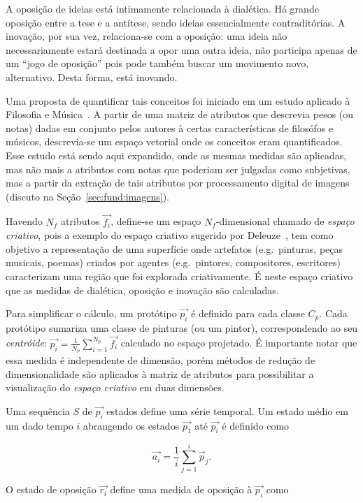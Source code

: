 A oposição de ideias está intimamente relacionada à dialética. Há grande
oposição entre a tese e a antítese, sendo ideias essencialmente
contraditórias. A inovação, por sua vez, relaciona-se com a oposição: uma ideia
não necessariamente estará destinada a opor uma outra ideia, não participa
apenas de um ``jogo de oposição'' pois pode também buscar um movimento novo,
alternativo. Desta forma, está inovando.

Uma proposta de quantificar tais conceitos foi iniciado em um estudo aplicado à
Filosofia e Música~\cite{vieira}. A partir de uma matriz de atributos que
descrevia pesos (ou notas) dadas em conjunto pelos autores à certas
características de filosófos e músicos, descrevia-se um espaço vetorial onde os
conceitos eram quantificados. Esse estudo está sendo aqui expandido, onde as
mesmas medidas são aplicadas, mas não mais a atributos com notas que poderiam
ser julgadas como subjetivas, mas a partir da extração de tais atributos por
processamento digital de imagens (discuto na Seção~\ref{sec:fund:imagens}).

Havendo $N_f$ atributos $\vec{f_i}$, define-se um espaço $N_f$-dimensional chamado de
\textit{espaço criativo}, pois a exemplo do espaço criativo sugerido por
Deleuze~\cite{deleuze}, tem como objetivo a representação de uma superfície onde artefatos
(e.g.\ pinturas, peças musicais, poemas) criados por agentes (e.g.\ pintores,
compositores, escritores) caracterizam uma região que foi explorada
criativamente. É neste espaço criativo que as medidas de dialética, oposição e
inovação são calculadas.

Para simplificar o cálculo, um protótipo $\vec{p_i}$ é definido para cada classe
$C_p$. Cada protótipo sumariza uma classe de pinturas (ou um pintor),
correspondendo ao seu \textit{centróide}: $\vec{p_i} = \frac{1}{N_p}
\sum_{i=1}^{N_p} \vec{f_i}$ calculado no espaço projetado. É importante notar
que essa medida é independente de dimensão, porém métodos de redução de
dimensionalidade são aplicados à matriz de atributos para possibilitar a
visualização do \textit{espaço criativo} em duas dimensões.

Uma sequência $S$ de $\vec{p_i}$ estados define uma série temporal. Um estado
médio em um dado tempo $i$ abrangendo os estados $\vec{p_1}$ até $\vec{p_i}$ é
definido como

\begin{equation}
\vec{a_i} = \frac{1}{i}\sum_{j=1}^i\vec{p}_j.
\end{equation}

O estado de oposição $\vec{r_i}$ define uma medida de oposição à $\vec{p_i}$ como

